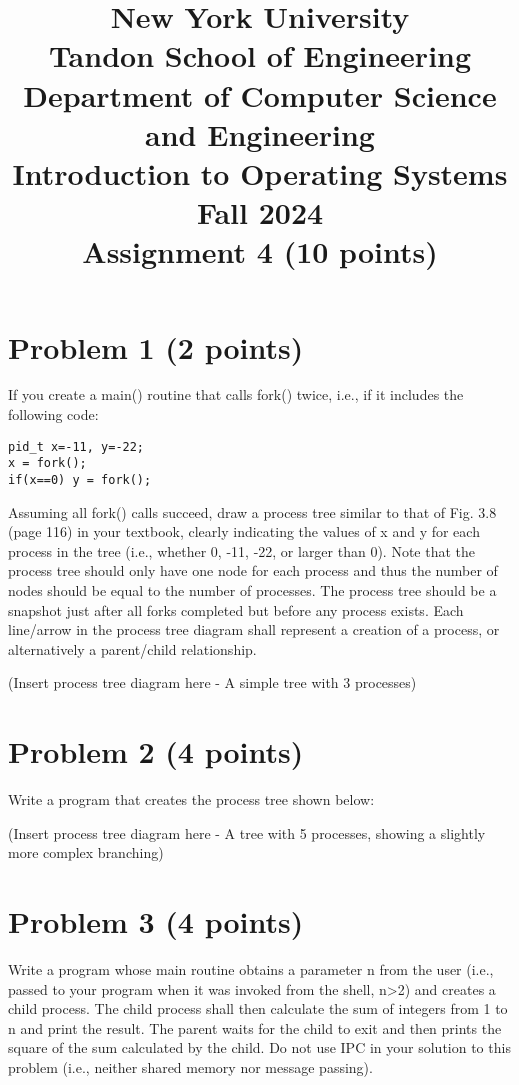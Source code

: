 \documentclass{article}
\title{New York University \\ Tandon School of Engineering \\ Department of Computer Science and Engineering \\ Introduction to Operating Systems \\ Fall 2024 \\ Assignment 4 (10 points)}
\author{ }
\date{}
\begin{document}
\maketitle

\section*{Problem 1 (2 points)}

If you create a main() routine that calls fork() twice, i.e., if it includes the following code:

\begin{verbatim}
pid_t x=-11, y=-22;
x = fork();
if(x==0) y = fork();
\end{verbatim}

Assuming all fork() calls succeed, draw a process tree similar to that of Fig. 3.8 (page 116) in your textbook, clearly indicating the values of x and y for each process in the tree (i.e., whether 0, -11, -22, or larger than 0). Note that the process tree should only have one node for each process and thus the number of nodes should be equal to the number of processes. The process tree should be a snapshot just after all forks completed but before any process exists. Each line/arrow in the process tree diagram shall represent a creation of a process, or alternatively a parent/child relationship.

(Insert process tree diagram here -  A simple tree with 3 processes)


\section*{Problem 2 (4 points)}

Write a program that creates the process tree shown below:

(Insert process tree diagram here - A tree with 5 processes, showing a slightly more complex branching)


\section*{Problem 3 (4 points)}

Write a program whose main routine obtains a parameter n from the user (i.e., passed to your program when it was invoked from the shell, n>2) and creates a child process. The child process shall then calculate the sum of integers from 1 to n and print the result. The parent waits for the child to exit and then prints the square of the sum calculated by the child. Do not use IPC in your solution to this problem (i.e., neither shared memory nor message passing).
\end{document}
